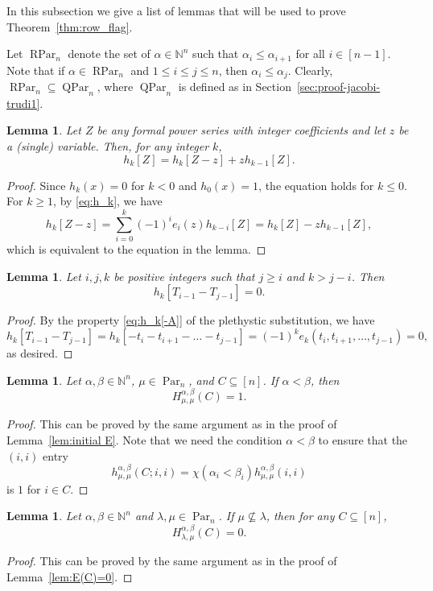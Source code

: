 \documentclass[12pt]{amsart}
\numberwithin{equation}{section}
\newtheorem{lem}[thm]{Lemma}
\theoremstyle{definition}
\newcommand\NN{\mathbb{N}}
\newcommand\Par{\operatorname{Par}}
\newcommand\RPar{\operatorname{RPar}}
\newcommand\QPar{\operatorname{QPar}}
\begin{document}
In this subsection we give a list of lemmas that will be used to prove
Theorem~\ref{thm:row_flag}.

Let $\RPar_n$ denote the set of $\alpha\in\NN^n$ such that $\alpha_i\le
\alpha_{i+1}$ for all $i\in[n-1]$.
Note that if $\alpha\in\RPar_n$ and $1\le i\le j\le n$,
then $\alpha_i\le \alpha_j$.
Clearly, $\RPar_n \subseteq \QPar_n$, where $\QPar_n$ is defined as in
Section~\ref{sec:proof-jacobi-trudi1}.

\begin{lem}\label{lem:pleth_h}
  Let $Z$ be any formal power series with integer coefficients and let $z$ be a
  (single) variable. Then, for any integer $k$,
  \[
h_k[Z]=h_k[Z-z] + z h_{k-1}[Z].
  \]
\end{lem}
\begin{proof}
  Since $h_k(x)=0$ for $k<0$ and $h_0(x)=1$, the equation holds for $k\le 0$.
  For $k\ge1$, by \eqref{eq:h_k}, we have
  \[
    h_k[Z-z]=\sum_{i=0}^k (-1)^i e_i(z)h_{k-i}[Z]=
    h_{k}[Z]- zh_{k-1}[Z],
  \]
which is equivalent to the equation in the lemma.
\end{proof}


\begin{lem}\label{lem:h=0}
  Let $i,j,k$ be positive integers such that
  $j\ge i$ and $k>j-i$. Then
  \[
    h_k[T_{i-1}-T_{j-1}]=0.
  \]
\end{lem}
\begin{proof}
  By the property \eqref{eq:h_k[-A]} of the plethystic substitution, we have
  \[
    h_k[T_{i-1}-T_{j-1}]=h_k[-t_i-t_{i+1}-\dots-t_{j-1}]
    = (-1)^k e_k(t_i,t_{i+1},\dots,t_{j-1}) = 0,
  \]
  as desired.
\end{proof}



\begin{lem}\label{lem:initial H}
  Let $\alpha,\beta\in\NN^n$, $\mu\in\Par_n$, and $C\subseteq[n]$. If
  $\alpha<\beta$, then
\[
  H^{\alpha,\beta}_{\mu,\mu}(C) = 1.
\]
\end{lem}
\begin{proof}
  This can be proved by the same argument as in the proof of
  Lemma~\ref{lem:initial E}. Note that we need the condition $\alpha<\beta$ to
  ensure that the $(i,i)$ entry
\[
h^{\alpha,\beta}_{\mu,\mu}(C;i,i) =
  \chi(\alpha_i<\beta_i) h^{\alpha,\beta}_{\mu,\mu}(i,i)
\]
is $1$ for $i\in C$.
\end{proof}


\begin{lem}\label{lem:H=0}
  Let $\alpha,\beta\in\NN^n$ and $\lambda,\mu\in\Par_n$. If
  $\mu\not\subseteq\lambda$, then for any $C\subseteq[n]$,
\[
  H^{\alpha,\beta}_{\lambda,\mu}(C) = 0.
\]
\end{lem}
\begin{proof}
This can be proved by the same argument as in the proof of
Lemma~\ref{lem:E(C)=0}.
\end{proof}
\end{document}

